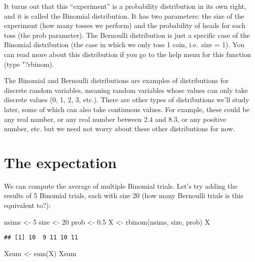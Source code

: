 \documentclass[
]{book}
\newenvironment{Shaded}{\begin{snugshade}}{\end{snugshade}}
\newcommand{\DecValTok}[1]{\textcolor[rgb]{0.00,0.00,0.81}{#1}}
\newcommand{\FloatTok}[1]{\textcolor[rgb]{0.00,0.00,0.81}{#1}}
\newcommand{\FunctionTok}[1]{\textcolor[rgb]{0.00,0.00,0.00}{#1}}
\newcommand{\NormalTok}[1]{#1}
\newcommand{\OtherTok}[1]{\textcolor[rgb]{0.56,0.35,0.01}{#1}}
\begin{document}
It turns out that this ``experiment'' is a probability distribution in its own right, and it is called the Binomial distribution. It has two parameters: the size of the experiment (how many tosses we perform) and the probability of heads for each toss (the prob parameter). The Bernoulli distribution is just a specific case of the Binomial distribution (the case in which we only toss 1 coin, i.e.~size = 1). You can read more about this distribution if you go to the help menu for this function (type "?rbinom).

The Binomial and Bernoulli distributions are examples of distributions for discrete random variables, meaning random variables whose values can only take discrete values (0, 1, 2, 3, etc.). There are other types of distributions we'll study later, some of which can also take continuous values. For example, these could be any real number, or any real number between 2.4 and 8.3, or any positive number, etc. but we need not worry about these other distributions for now.

\hypertarget{the-expectation}{%
\section{The expectation}\label{the-expectation}}

We can compute the average of multiple Binomial trials. Let's try adding the results of 5 Binomial trials, each with size 20 (how many Bernoulli trials is this equivalent to?):

\begin{Shaded}
\begin{Highlighting}[]
\NormalTok{nsims }\OtherTok{\textless{}{-}} \DecValTok{5}
\NormalTok{size }\OtherTok{\textless{}{-}} \DecValTok{20}
\NormalTok{prob }\OtherTok{\textless{}{-}} \FloatTok{0.5}
\NormalTok{X }\OtherTok{\textless{}{-}} \FunctionTok{rbinom}\NormalTok{(nsims, size, prob)}
\NormalTok{X}
\end{Highlighting}
\end{Shaded}

\begin{verbatim}
## [1] 10  9 11 10 11
\end{verbatim}

\begin{Shaded}
\begin{Highlighting}[]
\NormalTok{Xsum }\OtherTok{\textless{}{-}} \FunctionTok{sum}\NormalTok{(X)}
\NormalTok{Xsum}
\end{Highlighting}
\end{Shaded}
\end{document}
